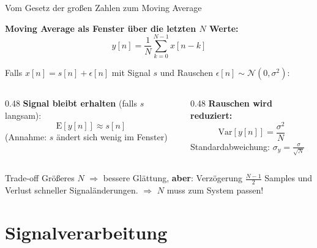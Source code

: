 \documentclass[%
  aspectratio=169,
  10pt
]{beamer}
\begin{document}
\begin{frame}{Vom Gesetz der großen Zahlen zum Moving Average}

\textbf{Moving Average als Fenster über die letzten $N$ Werte:}
\[
  y[n] = \frac{1}{N}\sum_{k=0}^{N-1} x[n-k]
\]

\vspace{1mm}
Falls $x[n] = s[n] + \epsilon[n]$ mit Signal $s$ und Rauschen
$\epsilon[n] \sim \mathcal{N}(0, \sigma^2)$:

\vspace{1mm}
\begin{columns}[T]
  \begin{column}{0.48\textwidth}
    \textbf{Signal bleibt erhalten} (falls $s$ langsam):
    \[
      \mathrm{E}[y[n]] \approx s[n]
    \]
    (Annahme: $s$ ändert sich wenig im Fenster)
  \end{column}
  \begin{column}{0.48\textwidth}
    \textbf{Rauschen wird reduziert:}
    \[
      \mathrm{Var}[y[n]] = \frac{\sigma^2}{N}
    \]
    Standardabweichung: $\sigma_y = \frac{\sigma}{\sqrt{N}}$
  \end{column}
\end{columns}

\vspace{3mm}
\begin{alertblock}{Trade-off}
  Größeres $N$ $\Rightarrow$ bessere Glättung, \textbf{aber}:
  Verzögerung $\frac{N-1}{2}$ Samples und Verlust schneller Signaländerungen.
  $\Rightarrow$ $N$ muss zum System passen!
\end{alertblock}

\end{frame}


\section{Signalverarbeitung}
\end{document}
